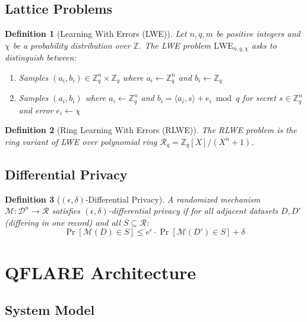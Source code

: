 \documentclass[journal,onecolumn,draftclsnofoot]{IEEEtran}
\newtheorem{definition}{Definition}
\begin{document}
\subsection{Lattice Problems}

\begin{definition}[Learning With Errors (LWE)]
Let $n, q, m$ be positive integers and $\chi$ be a probability distribution over $\mathbb{Z}$. The LWE problem $\text{LWE}_{n,q,\chi}$ asks to distinguish between:
\begin{enumerate}
\item Samples $(a_i, b_i) \in \mathbb{Z}_q^n \times \mathbb{Z}_q$ where $a_i \leftarrow \mathbb{Z}_q^n$ and $b_i \leftarrow \mathbb{Z}_q$
\item Samples $(a_i, b_i)$ where $a_i \leftarrow \mathbb{Z}_q^n$ and $b_i = \langle a_i, s \rangle + e_i \bmod q$ for secret $s \in \mathbb{Z}_q^n$ and error $e_i \leftarrow \chi$
\end{enumerate}
\end{definition}

\begin{definition}[Ring Learning With Errors (RLWE)]
The RLWE problem is the ring variant of LWE over polynomial ring $\mathcal{R}_q = \mathbb{Z}_q[X]/(X^n + 1)$.
\end{definition}

\subsection{Differential Privacy}

\begin{definition}[$(\epsilon, \delta)$-Differential Privacy]
A randomized mechanism $\mathcal{M}: \mathcal{D}^n \rightarrow \mathcal{R}$ satisfies $(\epsilon, \delta)$-differential privacy if for all adjacent datasets $D, D'$ (differing in one record) and all $S \subseteq \mathcal{R}$:
$$\Pr[\mathcal{M}(D) \in S] \leq e^\epsilon \cdot \Pr[\mathcal{M}(D') \in S] + \delta$$
\end{definition}

\section{QFLARE Architecture}

\subsection{System Model}
\end{document}
